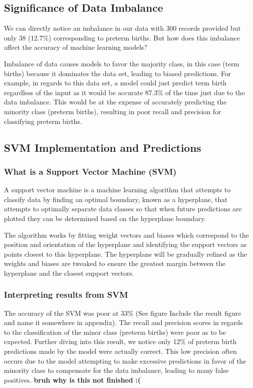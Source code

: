 \documentclass[conference]{IEEEtran}
\begin{document}
\subsection{Significance of Data Imbalance}
We can directly notice an imbalance in our data with 300 records provided but only 38 (12.7\%) corresponding to preterm births. But how does this imbalance affect the accuracy of machine learning models? 

Imbalance of data causes models to favor the majority class, in this case (term births) because it dominates the data set, leading to biased predictions. For example, in regards to this data set, a model could just predict term birth regardless of the input as it would be accurate 87.3\% of the time just due to the data imbalance. This would be at the expense of accurately predicting the minority class (preterm births), resulting in poor recall and precision for classifying preterm births.

\subsection{SVM Implementation and Predictions}
\subsubsection{What is a Support Vector Machine (SVM)}
A support vector machine is a machine learning algorithm that attempts to classify data by finding an optimal boundary, known as a hyperplane, that attempts to optimally separate data classes so that when future predictions are plotted they can be determined based on the hyperplane boundary. 

The algorithm works by fitting weight vectors and biases which correspond to the position and orientation of the hyperplane and identifying the support vectors as points closest to this hyperplane. The hyperplane will be gradually refined as the weights and biases are tweaked to ensure the greatest margin between the hyperplane and the closest support vectors. 

\subsubsection{Interpreting results from SVM}
The accuracy of the SVM was poor at 33\% (See figure Include the result figure and name it somewhere in appendix). The recall and precision scores in regards to the classification of the minor class (preterm births) were poor as to be expected. Further diving into this result, we notice only 12\% of preterm birth predictions made by the model were actually correct. This low precision often occurs due to the model attempting to make excessive predictions in favor of the minority class to compensate for the data imbalance, leading to many false positives. \textbf{bruh why is this not finished :(}
\end{document}
